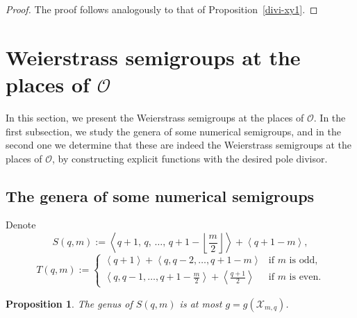 \documentclass[12pt]{amsart}
\newtheorem{proposition}[theorem]{Proposition}
\theoremstyle{remark}
\theoremstyle{definition}
\newcommand{\coloneqq}{\mathrel{:=}}
\begin{document}
\begin{proof}
The proof follows analogously to that of 
Proposition~\ref{divi-xy1}.
\end{proof}
	
	\section{\texorpdfstring
{Weierstrass semigroups at the places of $\mathcal{O}$}
{Weierstrass semigroups}}\label{sec:Weierstrass}
	In this section, we present the Weierstrass semigroups at the places of $\mathcal{O}$. In the first subsection, we study the genera of some numerical semigroups, and in the second one we determine that these are indeed the Weierstrass semigroups at the places of $\mathcal{O}$, by constructing explicit functions with the desired pole divisor.
	
	\subsection{The genera of some numerical semigroups}

Denote
\[
S(q,m) \coloneqq \left\langle q+1,\, q,\, \ldots,\, q+1-\left\lfloor\frac{m}{2}\right\rfloor \right\rangle
+ \left\langle q+1-m \right\rangle,
\]
\[
T(q,m) \coloneqq \begin{cases}
    \left\langle q+1 \right\rangle
    + \left\langle q, q-2, \ldots, q+1-m \right\rangle
    & \text{if } m \text{ is odd,} \\[4pt]
    \left\langle q, q-1, \ldots, q+1-\tfrac{m}{2} \right\rangle
    + \left\langle \tfrac{q+1}{2} \right\rangle
    & \text{if } m \text{ is even.}
\end{cases}
\]

\begin{proposition}\label{genus-P0}
    The genus of $S(q,m)$ is at most $g = g(\mathcal{X}_{m,q})$.
\end{proposition}
\end{document}
